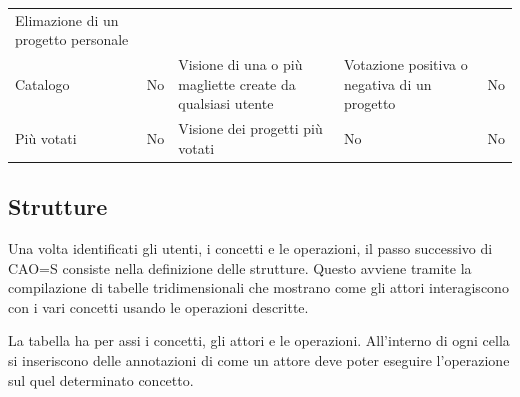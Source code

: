 \documentclass[12pt,italian,]{report}
\begin{document}
\begin{longtable}[]{|l|l|l|l|l|}
\begin{minipage}[t]{0.17\columnwidth}
Elimazione di un progetto personale\strut
\end{minipage}\tabularnewline
\begin{minipage}[t]{0.17\columnwidth}\raggedright
Catalogo\strut
\end{minipage} & \begin{minipage}[t]{0.17\columnwidth}\raggedright
No\strut
\end{minipage} & \begin{minipage}[t]{0.17\columnwidth}\raggedright
Visione di una o più magliette create da qualsiasi utente\strut
\end{minipage} & \begin{minipage}[t]{0.17\columnwidth}\raggedright
Votazione positiva o negativa di un progetto\strut
\end{minipage} & \begin{minipage}[t]{0.17\columnwidth}\raggedright
No\strut
\end{minipage}\tabularnewline
\begin{minipage}[t]{0.17\columnwidth}\raggedright
Più votati\strut
\end{minipage} & \begin{minipage}[t]{0.17\columnwidth}\raggedright
No\strut
\end{minipage} & \begin{minipage}[t]{0.17\columnwidth}\raggedright
Visione dei progetti più votati\strut
\end{minipage} & \begin{minipage}[t]{0.17\columnwidth}\raggedright
No\strut
\end{minipage} & \begin{minipage}[t]{0.17\columnwidth}\raggedright
No\strut
\end{minipage}\tabularnewline
\bottomrule
\end{longtable}

\subsection{Strutture}\label{strutture}

Una volta identificati gli utenti, i concetti e le operazioni, il passo
successivo di CAO=S consiste nella definizione delle strutture. Questo
avviene tramite la compilazione di tabelle tridimensionali che mostrano
come gli attori interagiscono con i vari concetti usando le operazioni
descritte.

La tabella ha per assi i concetti, gli attori e le operazioni. All'interno di ogni cella si inseriscono delle annotazioni di come un attore deve poter eseguire l'operazione sul quel determinato concetto.
\end{document}
